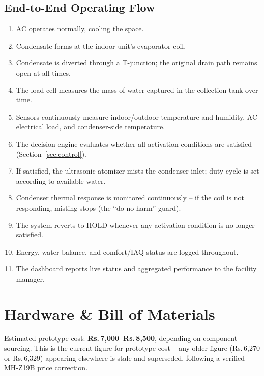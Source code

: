 \documentclass[11pt,a4paper]{article}
\newcommand{\textrupee}{Rs.\,}
\begin{document}
\subsection{End-to-End Operating Flow}
\begin{enumerate}
    \item AC operates normally, cooling the space.
    \item Condensate forms at the indoor unit's evaporator coil.
    \item Condensate is diverted through a T-junction; the original drain path remains open at all times.
    \item The load cell measures the mass of water captured in the collection tank over time.
    \item Sensors continuously measure indoor/outdoor temperature and humidity, AC electrical load, and condenser-side temperature.
    \item The decision engine evaluates whether all activation conditions are satisfied (Section~\ref{sec:control}).
    \item If satisfied, the ultrasonic atomizer mists the condenser inlet; duty cycle is set according to available water.
    \item Condenser thermal response is monitored continuously -- if the coil is not responding, misting stops (the ``do-no-harm'' guard).
    \item The system reverts to HOLD whenever any activation condition is no longer satisfied.
    \item Energy, water balance, and comfort/IAQ status are logged throughout.
    \item The dashboard reports live status and aggregated performance to the facility manager.
\end{enumerate}

\section{Hardware \& Bill of Materials}
\label{sec:bom}

\begin{limitation}
Estimated prototype cost: \textbf{\textrupee7{,}000--\textrupee8{,}500}, depending on component sourcing. This is the current figure for prototype cost -- any older figure (\textrupee6{,}270 or \textrupee6{,}329) appearing elsewhere is stale and superseded, following a verified MH-Z19B price correction.
\end{limitation}
\end{document}
